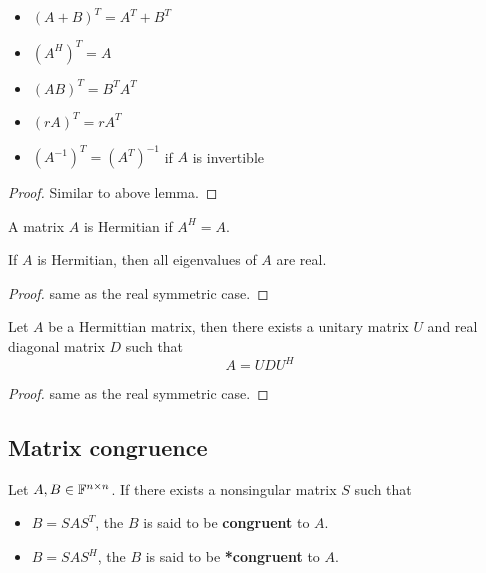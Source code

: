 \begin{refsection}
\begin{lemma}\hfill
\begin{itemize}
    \item $(A+B)^T = A^T + B^T$
    \item $(A^H)^T = A$
    \item $(AB)^T=B^TA^T$
    \item $(rA)^T = rA^T$
    \item $(A^{-1})^T = (A^T)^{-1}$ if $A$ is invertible
\end{itemize}
\end{lemma}
\begin{proof}
Similar to above lemma.
\end{proof}

\begin{definition}
A matrix $A$ is Hermitian if $A^H = A$.
\end{definition}


\begin{theorem}
If $A$ is Hermitian, then all eigenvalues of $A$ are real.
\end{theorem}
\begin{proof}
same as the real symmetric case.
\end{proof}


\begin{theorem}
Let $A$ be a Hermittian matrix, then there exists a unitary matrix $U$ and real diagonal matrix $D$ such that
$$A = UDU^H$$
\end{theorem}
\begin{proof}
	same as the real symmetric case.
\end{proof}

\subsection{Matrix congruence}
\begin{definition}[congruence]\cite[281]{horn2012matrix}
Let $A,B\in \mathbb{F}^{n\times n}$. If there exists a nonsingular matrix $S$ such that 
\begin{itemize}
    \item $B=SAS^T$, the $B$ is said to be \textbf{congruent} to $A$.
    \item $B=SAS^H$, the $B$ is said to be \textbf{*congruent} to $A$.
\end{itemize}
\end{definition}


\end{refsection}
